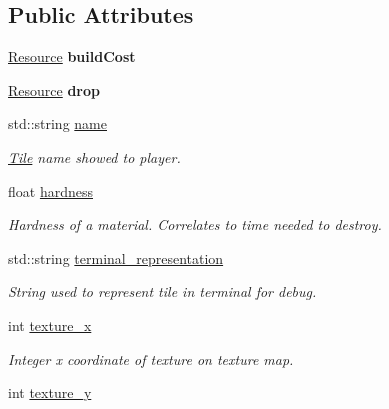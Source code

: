 \subsection*{Public Attributes}
\begin{DoxyCompactItemize}
\item 
\hypertarget{classTile_a4ed599912d54c30651137115ac15a91e}{\hyperlink{structResource}{Resource} {\bfseries build\-Cost}}\label{classTile_a4ed599912d54c30651137115ac15a91e}

\item 
\hypertarget{classTile_aeaeeec2011bc127120fdd3447d623235}{\hyperlink{structResource}{Resource} {\bfseries drop}}\label{classTile_aeaeeec2011bc127120fdd3447d623235}

\item 
\hypertarget{classTile_aa5408d0f0f4a60f25796f651db2f84ac}{std\-::string \hyperlink{classTile_aa5408d0f0f4a60f25796f651db2f84ac}{name}}\label{classTile_aa5408d0f0f4a60f25796f651db2f84ac}

\begin{DoxyCompactList}\small\item\em \hyperlink{classTile}{Tile} name showed to player. \end{DoxyCompactList}\item 
\hypertarget{classTile_accd68364f51cf745c5c95717a164b2e9}{float \hyperlink{classTile_accd68364f51cf745c5c95717a164b2e9}{hardness}}\label{classTile_accd68364f51cf745c5c95717a164b2e9}

\begin{DoxyCompactList}\small\item\em Hardness of a material. Correlates to time needed to destroy. \end{DoxyCompactList}\item 
\hypertarget{classTile_a4792f343c63f2b7c1bf1a7321ba60206}{std\-::string \hyperlink{classTile_a4792f343c63f2b7c1bf1a7321ba60206}{terminal\-\_\-representation}}\label{classTile_a4792f343c63f2b7c1bf1a7321ba60206}

\begin{DoxyCompactList}\small\item\em String used to represent tile in terminal for debug. \end{DoxyCompactList}\item 
\hypertarget{classTile_ac1b8010b027d438ee826af235dc00fe1}{int \hyperlink{classTile_ac1b8010b027d438ee826af235dc00fe1}{texture\-\_\-x}}\label{classTile_ac1b8010b027d438ee826af235dc00fe1}

\begin{DoxyCompactList}\small\item\em Integer x coordinate of texture on texture map. \end{DoxyCompactList}\item 
\hypertarget{classTile_addde9f80a365eae65b1f4bc156f18722}{int \hyperlink{classTile_addde9f80a365eae65b1f4bc156f18722}{texture\-\_\-y}}\label{classTile_addde9f80a365eae65b1f4bc156f18722}


\end{DoxyCompactItemize}
